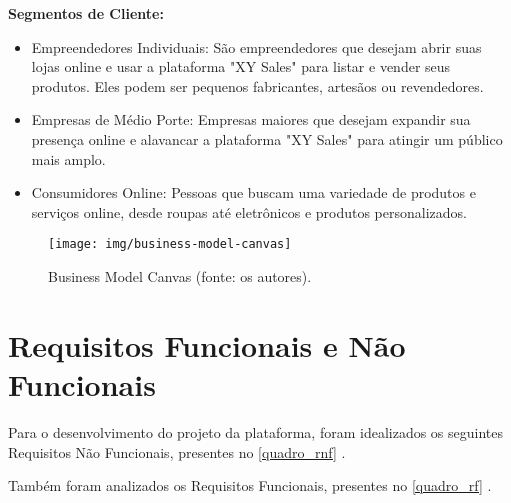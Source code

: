 \documentclass[
	12pt,				%
	openright,			%
	twoside,			%
	a4paper,			%
	english,			%
	brazil				%
	]{abntex2}
\begin{document}
\textbf{Segmentos de Cliente:}
\begin{itemize}
    \item Empreendedores Individuais: São empreendedores que desejam abrir suas lojas online e usar a plataforma "XY Sales" para listar e vender seus produtos. Eles podem ser pequenos fabricantes, artesãos ou revendedores.
    \item Empresas de Médio Porte: Empresas maiores que desejam expandir sua presença online e alavancar a plataforma "XY Sales" para atingir um público mais amplo.
    \item Consumidores Online: Pessoas que buscam uma variedade de produtos e serviços online, desde roupas até eletrônicos e produtos personalizados.
\end{itemize}

\begin{figure}[htb]
	\centering
	\texttt{[image: img/business-model-canvas]}
	\caption{Business Model Canvas (fonte: os autores).}
	\label{fig:business-model-canvas}
\end{figure}

\section{Requisitos Funcionais e Não Funcionais}

Para o desenvolvimento do projeto da plataforma, foram idealizados os seguintes Requisitos Não Funcionais, presentes no \autoref{quadro_rnf} . 

Também foram analizados os Requisitos Funcionais, presentes no \autoref{quadro_rf} .
\end{document}
